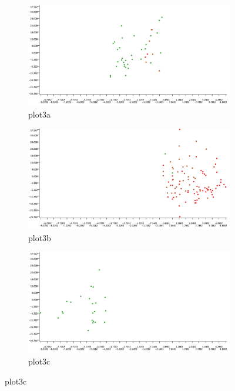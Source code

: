 \documentclass[11pt]{article}
\begin{document}
			 \begin{figure}[H]
			 	\centering
			 	\begin{subfigure}{0.4\textwidth}
			 		\includegraphics[width=\textwidth]{res/t1/t14/t14-plot3a}
			 		\caption{plot3a}
			 		\label{fig:first}
			 	\end{subfigure}
			 	\hfill
			 	\begin{subfigure}{0.4\textwidth}
			 		\includegraphics[width=\textwidth]{res/t1/t14/t14-plot3b}
			 		\caption{plot3b}
			 		\label{fig:second}
			 	\end{subfigure}
			 	\hfill
			 	\begin{subfigure}{0.4\textwidth}
			 		\includegraphics[width=\textwidth]{res/t1/t14/t14-plot3c}
			 		\caption{plot3c}
			 		\label{fig:third}
			 	\end{subfigure}
			 	\label{fig:figures} 
			 \end{figure}
\end{document}
